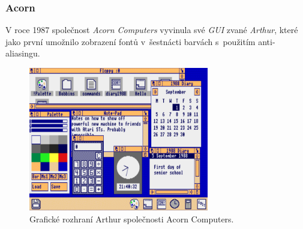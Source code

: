 \documentclass[11pt,twoside,a4paper]{book}
\begin{document}
\subsubsection{Acorn}
V roce 1987 společnost \textit{Acorn Computers} vyvinula své \textit{GUI} zvané \textit{Arthur}, které jako první umožnilo zobrazení fontů v~šestnácti barvách s~použitím anti-aliasingu.
\begin{figure}[!ht]
\begin{center}
  \includegraphics[width=0.7\textwidth]{arthur}
\caption{{\label{fig:arthurGUI}}Grafické rozhraní Arthur společnosti Acorn Computers.}
\end{center}
\end{figure}
\end{document}

